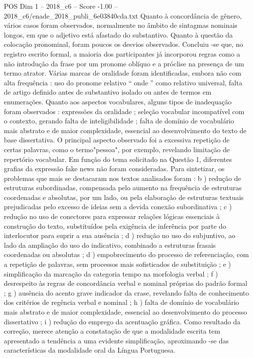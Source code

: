 \begin{textsample}{POS Dim 1 – 2018\_c6 – Score -1.00 – 2018\_c6/enade\_2018\_publi\_6e03840cda.txt}
Quanto à concordância de gênero, vários casos foram observados, normalmente no âmbito de sintagmas nominais longos, em que o adjetivo está afastado do substantivo.
Quanto à questão da colocação pronominal, foram poucos os desvios observados.
Concluiu -se que, no registro escrito formal, a maioria dos participantes já incorporou regras como a não introdução da frase por um pronome oblíquo e a próclise na presença de um termo atrator.
Várias marcas de oralidade foram identificadas, embora não com alta frequência : uso do pronome relativo “ onde ” como relativo universal, falta de artigo definido antes de substantivo isolado ou antes de termos em enumerações.
Quanto aos aspectos vocabulares, alguns tipos de inadequação foram observados : expressões da oralidade ; seleção vocabular incompatível com o contexto, gerando falta de inteligibilidade ; falta de domínio de vocabulário mais abstrato e de maior complexidade, essencial ao desenvolvimento do texto de base dissertativa.
O principal aspecto observado foi a excessiva repetição de certas palavras, como o termo"pessoa", por exemplo, revelando limitação de repertório vocabular.
Em função do tema solicitado na Questão 1, diferentes grafias da expressão fake news não foram consideradas.
Para sintetizar, os problemas que mais se destacaram nos textos analisados foram : b ) redução de estruturas subordinadas, compensada pelo aumento na frequência de estruturas coordenadas e absolutas, por um lado, ou pela elaboração de estruturas textuais prejudicadas pelo excesso de ideias sem a devida conexão subordinativa ; c ) redução no uso de conectores para expressar relações lógicas essenciais à construção do texto, substituídos pela exigência de inferência por parte do interlocutor para suprir a sua ausência ; d ) redução no uso do subjuntivo, ao lado da ampliação do uso do indicativo, combinado a estruturas frasais coordenadas ou absolutas ; d ) empobrecimento do processo de referenciação, com a repetição de palavras, sem processos mais sofisticados de substituição ; e ) simplificação da marcação da categoria tempo na morfologia verbal ; f ) desrespeito às regras de concordância verbal e nominal próprias do padrão formal ; g ) ausência do acento grave indicador da crase, revelando falta de conhecimento dos critérios de regência verbal e nominal ; h ) falta de domínio de vocabulário mais abstrato e de maior complexidade, essencial ao desenvolvimento do processo dissertativo ; i ) redução do emprego da acentuação gráfica.
Como resultado da correção, merece atenção a constatação de que a modalidade escrita tem apresentado a tendência a uma evidente simplificação, aproximando -se das características da modalidade oral da Língua Portuguesa.

\end{textsample}
